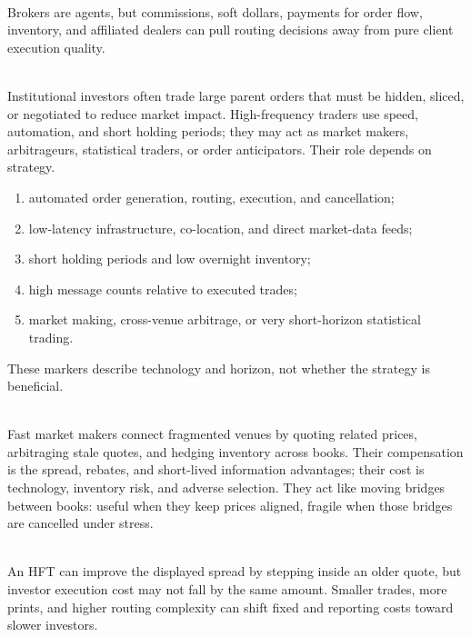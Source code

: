 \documentclass[a4paper,oneside,openany]{book}
\begin{document}
\begin{caveat} \\
Brokers are agents, but commissions, soft dollars, payments for order flow, inventory, and affiliated dealers can pull routing decisions away from pure client execution quality.
\end{caveat}

\begin{practitionernote} \\
Institutional investors often trade large parent orders that must be hidden, sliced, or negotiated to reduce market impact. High-frequency traders use speed, automation, and short holding periods; they may act as market makers, arbitrageurs, statistical traders, or order anticipators. Their role depends on strategy.
\end{practitionernote}

\begin{taxonomy} 
\begin{enumerate}[label=\roman*.]
\setlength{\itemsep}{0pt}
\item automated order generation, routing, execution, and cancellation;
\item low-latency infrastructure, co-location, and direct market-data feeds;
\item short holding periods and low overnight inventory;
\item high message counts relative to executed trades;
\item market making, cross-venue arbitrage, or very short-horizon statistical trading.
\end{enumerate}
These markers describe technology and horizon, not whether the strategy is beneficial.
\end{taxonomy}

\begin{mechanism} \\
Fast market makers connect fragmented venues by quoting related prices, arbitraging stale quotes, and hedging inventory across books. Their compensation is the spread, rebates, and short-lived information advantages; their cost is technology, inventory risk, and adverse selection. They act like moving bridges between books: useful when they keep prices aligned, fragile when those bridges are cancelled under stress.
\end{mechanism}

\begin{caveat} \\
An HFT can improve the displayed spread by stepping inside an older quote, but investor execution cost may not fall by the same amount. Smaller trades, more prints, and higher routing complexity can shift fixed and reporting costs toward slower investors.
\end{caveat}
\end{document}
